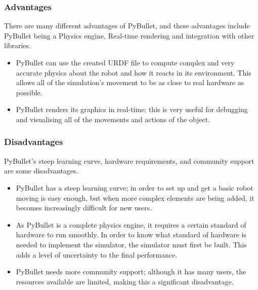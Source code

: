 \documentclass[12pt]{article}
\begin{document}
\subsubsection{Advantages}

There are many different advantages of PyBullet, and these advantages include PyBullet being a Physics engine, Real-time rendering and integration with other libraries.

\begin{itemize}
  \item PyBullet can use the created URDF file to compute complex and very accurate physics about the robot and how it reacts in its environment. This allows all of the simulation's movement to be as close to real hardware as possible.

  \item PyBullet renders its graphics in real-time; this is very useful for debugging and visualising all of the movements and actions of the object.

\end{itemize}

\subsubsection{Disadvantages}

PyBullet's steep learning curve, hardware requirements, and community support are some disadvantages. 
\begin{itemize}
  \item PyBullet has a steep learning curve; in order to set up and get a basic robot moving is easy enough, but when more complex elements are being added, it becomes increasingly difficult for new users.
  \item As PyBullet is a complete physics engine, it requires a certain standard of hardware to run smoothly. In order to know what standard of hardware is needed to implement the simulator, the simulator must first be built. This adds a level of uncertainty to the final performance.
  \item PyBullet needs more community support; although it has many users, the resources available are limited, making this a significant disadvantage. 

\end{itemize}
 
\end{document}
